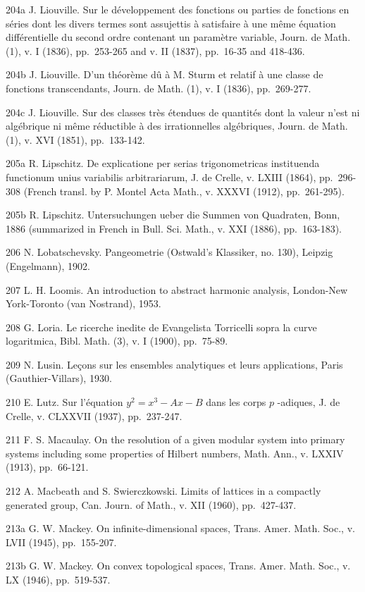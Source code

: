 204a J. Liouville. Sur le développement des fonctions ou parties de fonctions en séries dont les divers termes sont assujettis à satisfaire à une même équation différentielle du second ordre contenant un paramètre variable, Journ. de Math. (1), v. I (1836), pp.~253-265 and v. II (1837), pp.~16-35 and 418-436.

204b J. Liouville. D'un théorème dû à M. Sturm et relatif à une classe de fonctions transcendants, Journ. de Math. (1), v. I (1836), pp.~269-277.

204c J. Liouville. Sur des classes très étendues de quantités dont la valeur n'est ni algébrique ni même réductible à des irrationnelles algébriques, Journ. de Math. (1), v. XVI (1851), pp.~133-142.

205a R. Lipschitz. De explicatione per serias trigonometricas instituenda functionum unius variabilis arbitrariarum, J. de Crelle, v. LXIII (1864), pp.~296-308 (French transl. by P. Montel Acta Math., v. XXXVI (1912), pp.~261-295).

205b R. Lipschitz. Untersuchungen ueber die Summen von Quadraten, Bonn, 1886 (summarized in French in Bull. Sci. Math., v. XXI (1886), pp.~163-183).

206 N. Lobatschevsky. Pangeometrie (Ostwald's Klassiker, no. 130), Leipzig (Engelmann), 1902.

207 L. H. Loomis. An introduction to abstract harmonic analysis, London-New York-Toronto (van Nostrand), 1953.

208 G. Loria. Le ricerche inedite de Evangelista Torricelli sopra la curve logaritmica, Bibl. Math. (3), v. I (1900), pp.~75-89.

209 N. Lusin. Leçons sur les ensembles analytiques et leurs applications, Paris (Gauthier-Villars), 1930.

210 E. Lutz. Sur l'équation \(y^{2} = x^{3} - Ax - B\) dans les corps \(p\) -adiques, J. de Crelle, v. CLXXVII (1937), pp.~237-247.

211 F. S. Macaulay. On the resolution of a given modular system into primary systems including some properties of Hilbert numbers, Math. Ann., v. LXXIV (1913), pp.~66-121.

212 A. Macbeath and S. Swierczkowski. Limits of lattices in a compactly generated group, Can. Journ. of Math., v. XII (1960), pp.~427-437.

213a G. W. Mackey. On infinite-dimensional spaces, Trans. Amer. Math. Soc., v. LVII (1945), pp.~155-207.

213b G. W. Mackey. On convex topological spaces, Trans. Amer. Math. Soc., v. LX (1946), pp.~519-537.

